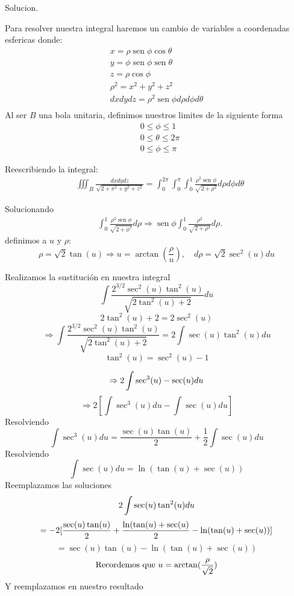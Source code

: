 Solucion.

Para resolver nuestra integral haremos un cambio de variables a coordenadas esfericas donde:
$$
\begin{aligned}
 x=\rho \operatorname{sen} \phi \cos \theta\\
 y=\phi \operatorname{sen} \phi \operatorname{sen} \theta\\ 
 z=\rho \cos \phi \\
 \rho^2=x^2+y^2+z^2 \\
 dxdydz=\rho^2 \operatorname{sen} \phi d \rho d \phi d \theta \\
\end{aligned}
$$
Al ser $B$ una bola unitaria, definimos nuestros limites de la siguiente forma
$$
\begin{aligned}
& 0 \leq \phi \leq 1 \\
& 0 \leq \theta \leq 2 \pi \\
& 0 \leq \phi \leq \pi
\end{aligned}
$$

Reescribiendo la integral:
$$
\begin{aligned}
& \iiint_B \frac{d x d y d z}{\sqrt{2+x^2+y^2+z^2}}=\int_0^{2 \pi} \int_0^\pi \int_0^1 \frac{\rho^2 \operatorname{sen} \phi}{\sqrt{2+\rho^2}} d \rho d \phi d \theta
\end{aligned}
$$

Solucionando
$$
\begin{aligned}
& \int_0^1 \frac{\rho^2 \operatorname{sen} \phi}{\sqrt{2+\phi^2}} d \rho \Rightarrow \operatorname{sen} \phi \int_0^1 \frac{\rho^2}{\sqrt{2+\rho^2}} d \rho.
\end{aligned}
$$
definimos a $u$ y $\rho$:
$$
\rho=\sqrt{2} \tan (u) \Rightarrow u=\arctan \left(\frac{\rho}{u}\right), \quad d\rho=\sqrt{2} \sec ^2(u) d u
$$

Realizamos la sustitución en nuestra integral
$$
 \int \frac{2^{3 / 2} \sec ^2(u) \tan ^2(u)}{\sqrt{2 \tan ^2(u)+2}} d u
 $$
 $$
 2\tan^2(u)+2=2\sec^2(u)
 $$
 $$
 \Rightarrow  \int \frac{2^{3 / 2} \sec ^2(u) \tan ^2(u)}{\sqrt{2 \tan ^2(u)+2}}
 =2 \int \sec (u) \tan ^2(u) d u
 $$
 $$
 \tan ^2(u)=\sec ^2(u)-1
 $$
 
 $$
 \Rightarrow 2 \int \sec ^3(u)-\sec (u) d u\\
$$
$$
 \Rightarrow 2\left[\int \sec ^3(u) d u-\int \sec (u) d u\right]
$$
Resolviendo
$$
 \int \sec ^3(u) d u= \frac{\sec (u) \tan (u)}{2}+\frac{1}{2} \int \sec (u) d u
 $$
Resolviendo
$$
 \int \sec (u) d u=\ln (\tan (u)+\sec (u))
 $$
Reemplazamos las soluciones
$$
 2 \int {\sec (u) \tan ^2(u)} d u \\
 $$
 $$
 = -2[\frac{\sec(u)\tan(u)}{2}+\frac{\ln(\tan (u)+\sec(u)}{2}-\ln(\tan (u)+\sec (u))]\\
 $$
 $$
 = \sec (u) \tan (u)-\ln (\tan ( u)+\sec (u))
$$
$$
\text{Recordemos que }\\
u=\arctan(\frac{\rho}{\sqrt{2}})\\
$$
Y reemplazamos en nuestro resultado

